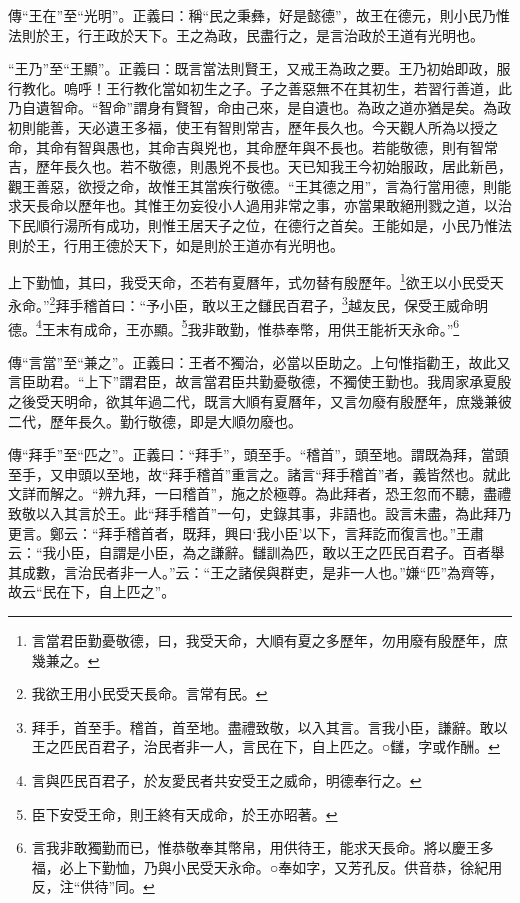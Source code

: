 {\noindent\zhuan{}\fzbyks 傳“王在”至“光明”。正義曰：稱“民之秉彝，好是懿德”，故王在德元，則小民乃惟法則於王，行王政於天下。王之為政，民盡行之，是言治政於王道有光明也。 \par}

{\noindent\shu{}\fzkt “王乃”至“王顯”。正義曰：既言當法則賢王，又戒王為政之要。王乃初始即政，服行教化。嗚呼！王行教化當如初生之子。子之善惡無不在其初生，若習行善道，此乃自遺智命。“智命”謂身有賢智，命由己來，是自遺也。為政之道亦猶是矣。為政初則能善，天必遺王多福，使王有智則常吉，歷年長久也。今天觀人所為以授之命，其命有智與愚也，其命吉與兇也，其命歷年與不長也。若能敬德，則有智常吉，歷年長久也。若不敬德，則愚兇不長也。天已知我王今初始服政，居此新邑，觀王善惡，欲授之命，故惟王其當疾行敬德。“王其德之用”，言為行當用德，則能求天長命以歷年也。其惟王勿妄役小人過用非常之事，亦當果敢絕刑戮之道，以治下民順行湯所有成功，則惟王居天子之位，在德行之首矣。王能如是，小民乃惟法則於王，行用王德於天下，如是則於王道亦有光明也。 \par}

上下勤恤，其曰，我受天命，丕若有夏曆年，式勿替有殷歷年。\footnote{言當君臣勤憂敬德，曰，我受天命，大順有夏之多歷年，勿用廢有殷歷年，庶幾兼之。}欲王以小民受天永命。”\footnote{我欲王用小民受天長命。言常有民。}拜手稽首曰：“予小臣，敢以王之讎民百君子，\footnote{拜手，首至手。稽首，首至地。盡禮致敬，以入其言。言我小臣，謙辭。敢以王之匹民百君子，治民者非一人，言民在下，自上匹之。○讎，字或作酬。}越友民，保受王威命明德。\footnote{言與匹民百君子，於友愛民者共安受王之威命，明德奉行之。}王末有成命，王亦顯。\footnote{臣下安受王命，則王終有天成命，於王亦昭著。}我非敢勤，惟恭奉幣，用供王能祈天永命。”\footnote{言我非敢獨勤而已，惟恭敬奉其幣帛，用供待王，能求天長命。將以慶王多福，必上下勤恤，乃與小民受天永命。○奉如字，又芳孔反。供音恭，徐紀用反，注“供待”同。}


{\noindent\zhuan{}\fzbyks 傳“言當”至“兼之”。正義曰：王者不獨治，必當以臣助之。上句惟指勸王，故此又言臣助君。“上下”謂君臣，故言當君臣共勤憂敬德，不獨使王勤也。我周家承夏殷之後受天明命，欲其年過二代，既言大順有夏曆年，又言勿廢有殷歷年，庶幾兼彼二代，歷年長久。勤行敬德，即是大順勿廢也。 \par}

{\noindent\zhuan{}\fzbyks 傳“拜手”至“匹之”。正義曰：“拜手”，頭至手。“稽首”，頭至地。謂既為拜，當頭至手，又申頭以至地，故“拜手稽首”重言之。諸言“拜手稽首”者，義皆然也。就此文詳而解之。“辨九拜，一曰稽首”，施之於極尊。為此拜者，恐王忽而不聽，盡禮致敬以入其言於王。此“拜手稽首”一句，史錄其事，非語也。設言未盡，為此拜乃更言。鄭云：“拜手稽首者，既拜，興曰‘我小臣’以下，言拜訖而復言也。”王肅云：“我小臣，自謂是小臣，為之謙辭。讎訓為匹，敢以王之匹民百君子。百者舉其成數，言治民者非一人。”云：“王之諸侯與群吏，是非一人也。”嫌“匹”為齊等，故云“民在下，自上匹之”。 \par}

